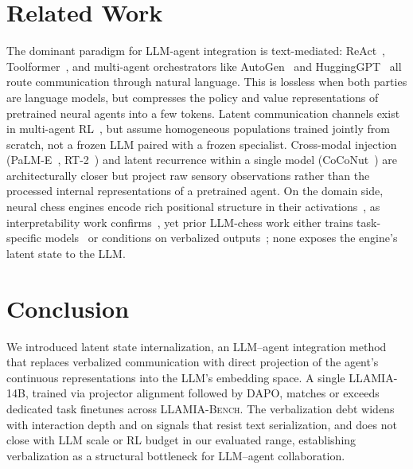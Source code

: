 \section{Related Work}
\vspace{-2mm}
The dominant paradigm for LLM-agent integration is text-mediated: ReAct~\cite{yao2022react}, Toolformer~\cite{schick2023toolformerlanguagemodelsteach}, and multi-agent orchestrators like AutoGen~\cite{wu2023autogen} and HuggingGPT~\cite{shen2024hugginggpt} all route communication through natural language. This is lossless when both parties are language models, but compresses the policy and value representations of pretrained neural agents into a few tokens. Latent communication channels exist in multi-agent RL~\cite{sukhbaatar2016learningmultiagentcommunicationbackpropagation,das2019tarmac,foerster2016learning}, but assume homogeneous populations trained jointly from scratch, not a frozen LLM paired with a frozen specialist. Cross-modal injection (PaLM-E~\cite{driess2023palmeembodiedmultimodallanguage}, RT-2~\cite{brohan2023rt2visionlanguageactionmodelstransfer}) and latent recurrence within a single model (CoCoNut~\cite{hao2025traininglargelanguagemodels}) are architecturally closer but project raw sensory observations rather than the processed internal representations of a pretrained agent.  On the domain side, neural chess engines encode rich positional structure in their activations~\cite{silver2017mastering,monroe2024mastering}, as interpretability work confirms~\cite{jenner2024evidence}, yet prior LLM-chess work either trains task-specific models~\cite{jhamtani-etal-2018-learning} or conditions on verbalized outputs~\cite{feng2024chessgpt}; none exposes the engine's latent state to the LLM.

\vspace{-2mm}
\section{Conclusion}
\label{sec:conclusion}
\vspace{-2mm}
We introduced latent state internalization, an LLM--agent integration method that
replaces verbalized communication with direct projection of the agent's continuous
representations into the LLM's embedding space. A single LLAMIA-14B, trained via
projector alignment followed by DAPO, matches or exceeds dedicated task finetunes across
\textsc{LLAMIA-Bench}. The verbalization debt widens with interaction depth and on
signals that resist text serialization, and does not close with LLM scale or RL budget in
our evaluated range, establishing verbalization as a structural bottleneck for LLM--agent
collaboration.

